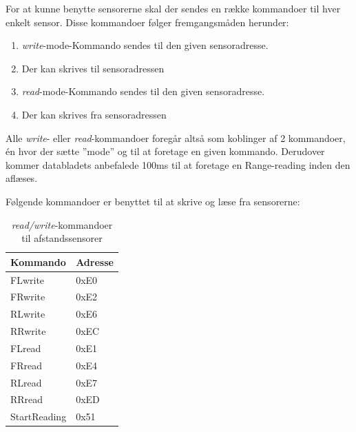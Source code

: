 For at kunne benytte sensorerne skal der sendes en række kommandoer til hver enkelt sensor. Disse kommandoer følger fremgangsmåden herunder:

\begin{enumerate}
  \item \textit{write}-mode-Kommando sendes til den given sensoradresse.
  \item Der kan skrives til sensoradressen
  \item \textit{read}-mode-Kommando sendes til den given sensoradresse.
  \item Der kan skrives fra sensoradressen
\end{enumerate}

Alle \textit{write}- eller \textit{read}-kommandoer foregår altså som koblinger af 2 kommandoer, én hvor der sætte ''mode'' og til at foretage en given kommando. Derudover kommer databladets anbefalede 100ms til at foretage en Range-reading inden den aflæses.

Følgende kommandoer er benyttet til at skrive og læse fra sensorerne: 

\begin{table}[h]\centering
	\begin{tabular}{| l | l |} \hline
		\textbf{Kommando} & \textbf{Adresse}	\\\hline
		FLwrite 		  & 0xE0				\\\hline
		FRwrite 		  & 0xE2				\\\hline
		RLwrite 		  & 0xE6				\\\hline
		RRwrite 		  & 0xEC				\\\hline
		FLread  		  & 0xE1				\\\hline
		FRread  		  & 0xE4				\\\hline
		RLread  		  & 0xE7				\\\hline
		RRread  		  & 0xED				\\\hline
		StartReading	  & 0x51				\\\hline
	\end{tabular}
	\caption{\textit{read/write}-kommandoer til afstandssensorer}
	\label{table:adr_afstandssensorer_kommadoer}
\end{table}
